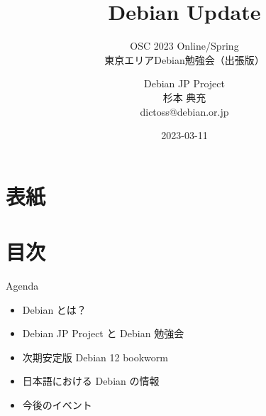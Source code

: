 \title{Debian Update}
\subtitle{OSC 2023 Online/Spring \\東京エリアDebian勉強会（出張版）}
\author{Debian JP Project \\杉本 典充\\ dictoss@debian.or.jp}
\date{2023-03-11}




\section{表紙}

\begin{frame}
\titlepage{}
\end{frame}

\section{目次}

\begin{frame}{Agenda}
  \begin{itemize}
  \item Debian とは？
  \item Debian JP Project と Debian 勉強会
  \item 次期安定版 Debian 12 bookworm
  \item 日本語における Debian の情報
  \item 今後のイベント
  \end{itemize}
\end{frame}

